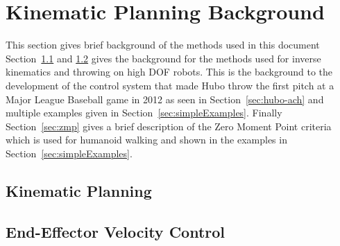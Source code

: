 \chapter{Kinematic Planning Background}\label{sec:KinematicPlaningBackground}

This section gives brief background of the methods used in this document
Section~\ref{sec:back:ik} and \ref{sec:back:eefvelos} gives the background for the methods used for inverse kinematics and throwing on high DOF robots.
This is the background to the development of the control system that made Hubo throw the first pitch at a Major League Baseball game in 2012 as seen in Section~\ref{sec:hubo-ach} and multiple examples given in Section~\ref{sec:simpleExamples}.
Finally Section~\ref{sec:zmp} gives a brief description of the Zero Moment Point criteria which is used for humanoid walking and shown in the examples in Section~\ref{sec:simpleExamples}.

		\section{Kinematic Planning}\label{sec:back:ik}
			
		\section{End-Effector Velocity Control}\label{sec:back:eefvelos}
			
%			
		
